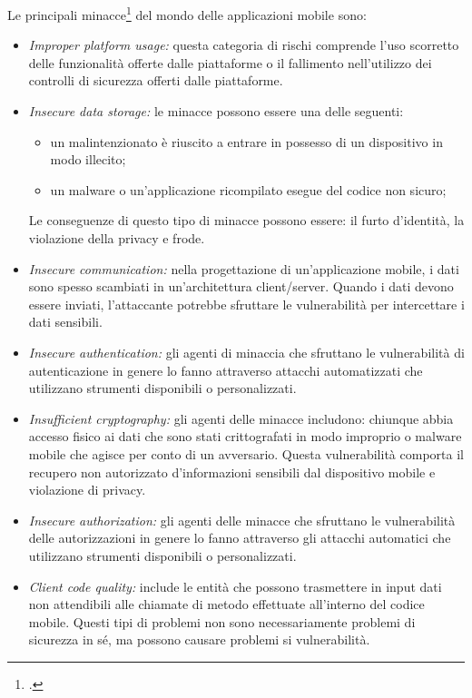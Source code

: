 Le principali minacce\footcite{site:owasp} del mondo delle applicazioni mobile sono:
\begin{itemize}
    \item \textit{Improper platform usage:} questa categoria di rischi comprende l'uso scorretto delle funzionalità offerte dalle piattaforme o il fallimento nell'utilizzo dei controlli di sicurezza offerti dalle piattaforme.
    \item \textit{Insecure data storage:} le minacce possono essere una delle seguenti:
    \begin{itemize}
        \item un malintenzionato è riuscito a entrare in possesso di un dispositivo in modo illecito;
        \item un malware o un'applicazione ricompilato esegue del codice non sicuro;
    \end{itemize}
    Le conseguenze di questo tipo di minacce possono essere: il furto d'identità, la violazione della privacy e frode.
    \item \textit{Insecure communication:}
    nella progettazione di un'applicazione mobile, i dati sono spesso scambiati in un'architettura client/server.
    Quando i dati devono essere inviati, l'attaccante potrebbe sfruttare le vulnerabilità per intercettare i dati sensibili.
    \item \textit{Insecure authentication:}
    gli agenti di minaccia che sfruttano le vulnerabilità di autenticazione in genere lo fanno attraverso attacchi automatizzati che utilizzano strumenti disponibili o personalizzati.
    \item \textit{Insufficient cryptography:} gli agenti delle minacce includono: chiunque abbia accesso fisico ai dati che sono stati crittografati in modo improprio o malware mobile che agisce per conto di un avversario.
    Questa vulnerabilità comporta il recupero non autorizzato d'informazioni sensibili dal dispositivo mobile e violazione di privacy.
    \item \textit{Insecure authorization:}
    gli agenti delle minacce che sfruttano le vulnerabilità delle autorizzazioni in genere lo fanno attraverso gli attacchi automatici che utilizzano strumenti disponibili o personalizzati.
    \item \textit{Client code quality:} include le entità che possono trasmettere in input dati non attendibili alle chiamate di metodo effettuate all'interno del codice mobile.
    Questi tipi di problemi non sono necessariamente problemi di sicurezza in sé, ma possono causare problemi si vulnerabilità.


\end{itemize}
